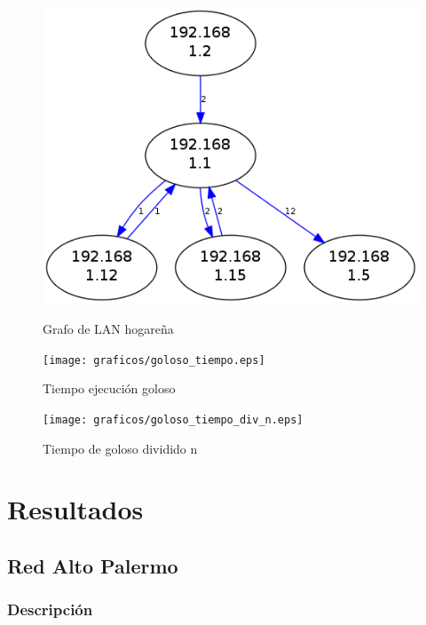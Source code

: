 \documentclass[10pt, a4paper]{article}
\begin{document}
\begin{figure}[H]
  \begin{center}
    \includegraphics[width=\linewidth/2]{../imgs/pruebaFede-ips_red.png}
    \label{fig:FedeGrafo}
    \caption{Grafo de LAN hogareña}
  \end{center}
\end{figure}


 \begin{figure}[H]
   \begin{minipage}{0.5\linewidth}
     \texttt{[image: graficos/goloso\_tiempo.eps]}
     \caption{Tiempo ejecución goloso}\label{fig:goloso-tiempo}
   \end{minipage}
  \hfill
   \begin{minipage}{0.5\linewidth}
     \texttt{[image: graficos/goloso\_tiempo\_div\_n.eps]}
     \caption{Tiempo de goloso dividido n}\label{fig:goloso-tiempo-n}
   \end{minipage}
 \end{figure}



\section{Resultados}

\subsection{Red Alto Palermo}

\subsubsection{Descripción}
\end{document}
